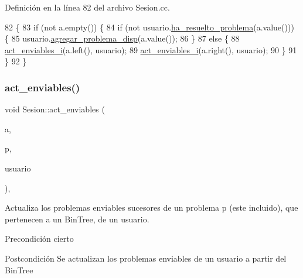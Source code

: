 Definición en la línea 82 del archivo Sesion.\+cc.


\begin{DoxyCode}
82                                                                              \{
83         \textcolor{keywordflow}{if} (not a.empty()) \{
84           \textcolor{keywordflow}{if} (not usuario.\mbox{\hyperlink{class_usuario_a6f9608eac6a6a05d850dcad07bdf37f3}{ha\_resuelto\_problema}}(a.value())) \{
85             usuario.\mbox{\hyperlink{class_usuario_a4dedcdcfe3d1769d6d2106d9fb2f7e51}{agregar\_problema\_disp}}(a.value());
86           \}
87           \textcolor{keywordflow}{else} \{
88             \mbox{\hyperlink{class_sesion_ad391d505577569f30635f19a0f36c9a0}{act\_enviables\_i}}(a.left(), usuario);
89             \mbox{\hyperlink{class_sesion_ad391d505577569f30635f19a0f36c9a0}{act\_enviables\_i}}(a.right(), usuario);
90           \}
91         \}
92       \}
\end{DoxyCode}
\mbox{\label{class_sesion_a7e64b66ecf1ad363dd0c394ec59eaa91}} 
\subsubsection{\texorpdfstring{act\+\_\+enviables()}{act\_enviables()}}
{\footnotesize\ttfamily void Sesion\+::act\+\_\+enviables (\begin{DoxyParamCaption}\item[{const Bin\+Tree$<$ string $>$ \&}]{a,  }\item[{const string \&}]{p,  }\item[{\mbox{\hyperlink{class_usuario}{Usuario}} \&}]{usuario }\end{DoxyParamCaption})\hspace{0.3cm}{\ttfamily [static]}, {\ttfamily [private]}}



Actualiza los problemas enviables sucesores de un problema p (este incluido), que pertenecen a un Bin\+Tree, de un usuario. 

\begin{DoxyPrecond}{Precondición}
cierto 
\end{DoxyPrecond}
\begin{DoxyPostcond}{Postcondición}
Se actualizan los problemas enviables de un usuario a partir del Bin\+Tree 
\end{DoxyPostcond}


